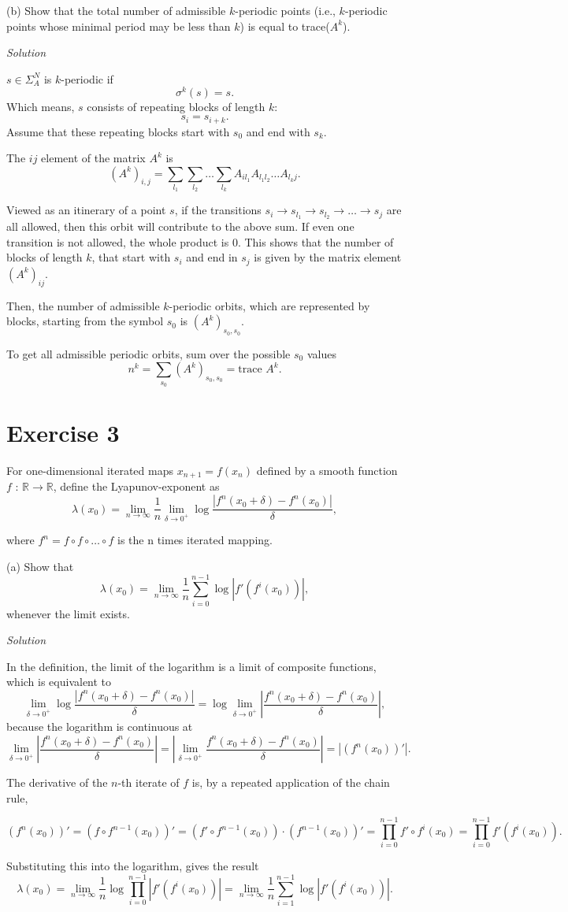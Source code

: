\documentclass[a4paper,11pt,pdftex]{article}
\newcommand{\R}{\mathbb{R}}
\begin{document}
(b) Show that the total number of admissible $k$-periodic points (i.e., $k$-periodic points whose minimal
period may be less than $k$) is equal to trace($A^k$).

\emph{Solution}

$s\in \Sigma_A^N$ is $k$-periodic if 
$$
\sigma^k(s) = s.
$$
Which means, $s$ consists of repeating blocks of length $k$:
$$
s_i = s_{i+k}.
$$
Assume that these repeating blocks start with $s_0$ and end with $s_k$.

The $ij$ element of the matrix $A^k$ is
$$
(A^k)_{i,j} = \sum_{l_1}\sum_{l_2}\dots \sum_{l_k} A_{il_1}A_{l_1l_2}\dots A_{l_k j}. 
$$

Viewed as an itinerary of a point $s$, if the transitions $s_i \to s_{l_1} \to s_{l_2} \to \dots \to s_j$ are all allowed, then this orbit will contribute to the above sum. If even one transition is not allowed, the whole product is 0. This shows that the number of blocks of length $k$, that start with $s_i$ and end in $s_j$ is given by the matrix element $(A^k)_{ij}$.

Then, the number of admissible $k$-periodic orbits, which are represented by blocks, starting from the symbol $s_0$ is $(A^k)_{s_0,s_0}$. 

To get all admissible periodic orbits, sum over the possible $s_0$ values
$$
n^k = \sum_{s_0} (A^k)_{s_0,s_0} = \text{trace } A^k. 
$$
\section*{Exercise 3}
For one-dimensional iterated maps $x_{n+1} = f(x_n)$ defined by a smooth function $f$ : $\R \to \R$, define the Lyapunov-exponent as
$$
\lambda(x_0) = \lim_{n\to \infty}\frac{1}{n}\lim_{\delta \to 0^+} \log \frac{|f^n(x_0 + \delta) - f^n(x_0)|}{\delta},
$$

where $f^n = f\circ f \circ \dots \circ f$ is the n times iterated mapping. 

(a) Show that
$$
\lambda(x_0) = \lim_{n\to \infty}\frac{1}{n}\sum_{i=0}^{n-1}\log |f'(f^i(x_0))|,
$$
whenever the limit exists. 

\emph{Solution}

In the definition, the limit of the logarithm is a limit of composite functions, which is equivalent to  
$$
\lim_{\delta \to 0^+} \log \frac{|f^n(x_0 + \delta) - f^n(x_0)|}{\delta} = \log \lim_{\delta \to 0^+} \left \vert \frac{f^n(x_0 + \delta) - f^n(x_0)}{\delta}\right \vert,
$$
because the logarithm is continuous at 
$$
\lim_{\delta \to 0^+} \left \vert \frac{f^n(x_0 + \delta) - f^n(x_0)}{\delta}\right \vert = \left \vert \lim_{\delta \to 0^+} \frac{f^n(x_0 + \delta) - f^n(x_0)}{\delta}\right \vert = |(f^n(x_0))'|.
$$

The derivative of the $n$-th iterate of $f$ is, by a repeated application of the chain rule,

$$
(f^n(x_0))'=(f\circ f^{n-1}(x_0))' = (f'\circ f^{n-1}(x_0))\cdot (f^{n-1}(x_0))' = \prod_{i=0}^{n-1} f'\circ f^{i}(x_0) = \prod_{i=0}^{n-1} f'(f^{i}(x_0)).
$$

Substituting this into the logarithm, gives the result
$$
\lambda(x_0) = \lim_{n\to \infty}\frac{1}{n}\log \prod_{i=0}^{n-1} |f'(f^{i}(x_0))| = \lim_{n\to \infty}\frac{1}{n} \sum_{i=1}^{n-1} \log |f'(f^{i}(x_0))|.
$$
\end{document}
